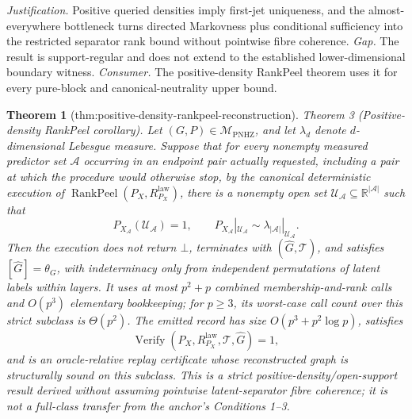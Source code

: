 \documentclass{article}
\newtheorem{theorem}{Theorem}
\begin{document}
\par\smallskip\noindent \textit{Justification.} Positive queried densities imply first-jet uniqueness, and the almost-everywhere bottleneck turns directed Markovness plus conditional sufficiency into the restricted separator rank bound without pointwise fibre coherence. \textit{Gap.} The result is support-regular and does not extend to the established lower-dimensional boundary witness. \textit{Consumer.} The positive-density RankPeel theorem uses it for every pure-block and canonical-neutrality upper bound.

\begin{theorem}[thm:positive-density-rankpeel-reconstruction]\label{thm:positive-density-rankpeel-reconstruction}
Theorem 3 (Positive-density RankPeel corollary).  Let \((G,P)\in\mathcal M_{\mathrm{PNHZ}}\), and let \(\lambda_d\) denote \(d\)-dimensional Lebesgue measure.  Suppose that for every nonempty measured predictor set \(\mathcal A\) occurring in an endpoint pair actually requested, including a pair at which the procedure would otherwise stop, by the canonical deterministic execution of \(\operatorname{RankPeel}(P_X,R^{\mathrm{law}}_{P_X})\), there is a nonempty open set \(\mathcal U_{\mathcal A}\subseteq\mathbb R^{|\mathcal A|}\) such that
\[
 P_{X_{\mathcal A}}(\mathcal U_{\mathcal A})=1,
 \qquad
 P_{X_{\mathcal A}}|_{\mathcal U_{\mathcal A}}
 \sim\lambda_{|\mathcal A|}|_{\mathcal U_{\mathcal A}}.
\]
Then the execution does not return \(\bot\), terminates with \((\widehat G,\mathcal T)\), and satisfies \([\widehat G]=\theta_G\), with indeterminacy only from independent permutations of latent labels within layers.  It uses at most \(p^2+p\) combined membership-and-rank calls and \(O(p^3)\) elementary bookkeeping; for \(p\geq3\), its worst-case call count over this strict subclass is \(\Theta(p^2)\).  The emitted record has size \(O(p^3+p^2\log p)\), satisfies
\[
 \operatorname{Verify}(P_X,R^{\mathrm{law}}_{P_X},\mathcal T,\widehat G)=1,
\]
and is an oracle-relative replay certificate whose reconstructed graph is structurally sound on this subclass.  This is a strict positive-density/open-support result derived without assuming pointwise latent-separator fibre coherence; it is not a full-class transfer from the anchor's Conditions 1--3.
\end{theorem}
\end{document}

